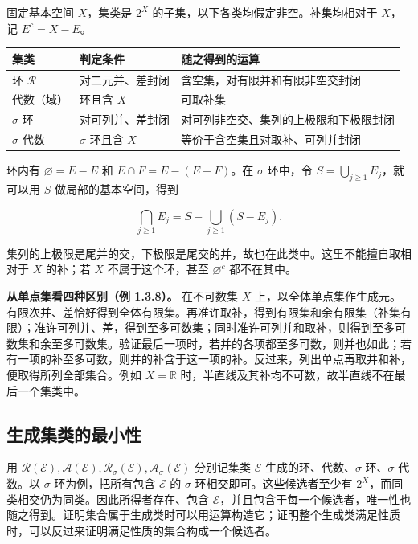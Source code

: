\documentclass[11pt,a4paper]{article}
\begin{document}
固定基本空间 \(X\)，集类是 \(2^X\) 的子集，以下各类均假定非空。补集均相对于 \(X\)，记 \(E^c=X-E\)。

\begin{center}
\begin{tabularx}{\linewidth}{@{}p{.21\linewidth}p{.33\linewidth}X@{}}
\toprule
集类 & 判定条件 & 随之得到的运算 \\ \midrule
环 $\mathcal R$ & 对二元并、差封闭 & 含空集，对有限并和有限非空交封闭 \\
代数（域） & 环且含 $X$ & 可取补集 \\
$\sigma$ 环 & 对可列并、差封闭 & 对可列非空交、集列的上极限和下极限封闭 \\
$\sigma$ 代数 & $\sigma$ 环且含 $X$ & 等价于含空集且对取补、可列并封闭 \\
\bottomrule
\end{tabularx}
\end{center}

环内有 \(\varnothing=E-E\) 和 \(E\cap F=E-(E-F)\)。在 \(\sigma\) 环中，令 \(S=\bigcup_{j\ge1}E_j\)，就可以用 \(S\) 做局部的基本空间，得到

\[
\bigcap_{j\ge1}E_j=S-\bigcup_{j\ge1}(S-E_j).
\]

集列的上极限是尾并的交，下极限是尾交的并，故也在此类中。这里不能擅自取相对于 \(X\) 的补；若 \(X\) 不属于这个环，甚至 \(\varnothing^c\) 都不在其中。

\textbf{从单点集看四种区别（例 1.3.8）。} 在不可数集 \(X\) 上，以全体单点集作生成元。有限次并、差恰好得到全体有限集。再准许取补，得到有限集和余有限集（补集有限）；准许可列并、差，得到至多可数集；同时准许可列并和取补，则得到至多可数集和余至多可数集。验证最后一项时，若并的各项都至多可数，则并也如此；若有一项的补至多可数，则并的补含于这一项的补。反过来，列出单点再取并和补，便取得所列全部集合。例如 \(X=\mathbb R\) 时，半直线及其补均不可数，故半直线不在最后一个集类中。

\subsection{生成集类的最小性}

用 \(\mathcal R(\mathcal E),\mathcal A(\mathcal E),\mathcal R_\sigma(\mathcal E),\mathcal A_\sigma(\mathcal E)\) 分别记集类 \(\mathcal E\) 生成的环、代数、\(\sigma\) 环、\(\sigma\) 代数。以 \(\sigma\) 环为例，把所有包含 \(\mathcal E\) 的 \(\sigma\) 环相交即可。这些候选者至少有 \(2^X\)，而同类相交仍为同类。因此所得者存在、包含 \(\mathcal E\)，并且包含于每一个候选者，唯一性也随之得到。证明集合属于生成类时可以用运算构造它；证明整个生成类满足性质时，可以反过来证明满足性质的集合构成一个候选者。
\end{document}
